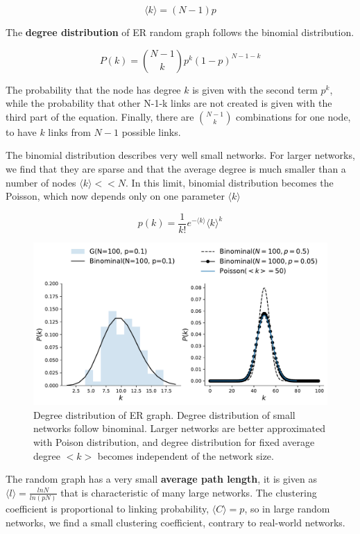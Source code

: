 \begin{equation}
\langle k \rangle = (N-1)p 
\end{equation}

The \textbf{degree distribution} of ER random graph follows the binomial distribution. 

\begin{equation}
P(k) = \binom{N-1}{k}p^k(1-p)^{N-1-k}
\end{equation}

The probability that the node has degree $k$ is given with the second term $p^k$, while the probability that other N-1-k links are not created is given with the third part of the equation. Finally, there are  $\binom{N-1}{k}$ combinations for one node, to have $k$ links from $N-1$ possible links. 

The binomial distribution describes very well small networks. For larger networks, we find that they are sparse and that the average degree is much smaller than a number of nodes $\langle k \rangle << N$. In this limit, binomial distribution becomes the Poisson, which now depends only on one parameter $\langle k \rangle$

\begin{equation}
p(k) = \frac{1}{k!}e^{-\langle k \rangle}\langle k \rangle^{k}
\end{equation}

\begin{figure}[h!]
	\centering
	\includegraphics[width=0.9\linewidth]{figures/methodology/ER_dist}
	\caption{Degree distribution of ER graph. Degree distribution of small networks follow binominal. Larger networks are better approximated with Poison distribution, and degree distribution for fixed average degree $<k>$ becomes independent of the network size.}
	\label{fig:erdist}
\end{figure}

The random graph has a very small \textbf{average path length}, it is given as $\langle l \rangle = \frac{ln N}{ln(pN)}$ that is characteristic of many large networks. The clustering coefficient is proportional to linking probability, $\langle C \rangle = p$, so in large random networks, we find a small clustering coefficient, contrary to real-world networks. \\  %

